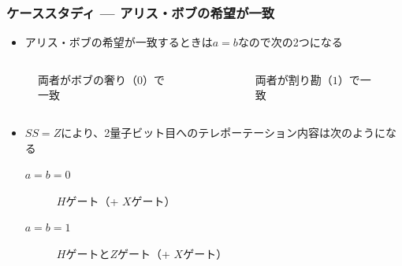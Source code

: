 \begin{frame}
  \frametitle{ケーススタディ --- アリス・ボブの希望が一致}

  \begin{itemize}
    \item アリス・ボブの希望が一致するときは$a = b$なので次の2つになる
  \end{itemize}

  \begin{columns}
    \begin{column}{0.5\textwidth}
      \begin{figure}
        \caption{両者がボブの奢り（$0$）で一致}
        \label{fig:a_equal_0}
      \end{figure}
    \end{column}
    \begin{column}{0.5\textwidth}
      \begin{figure}
        \caption{両者が割り勘（$1$）で一致}
        \label{fig:a_equal_1}
      \end{figure}
    \end{column}
  \end{columns}

  \pause
  \begin{itemize}
    \item $SS = Z$により、2量子ビット目へのテレポーテーション内容は次のようになる
    \begin{description}
      \item[$a = b = 0$] $H$ゲート（+ $X$ゲート）
      \item[$a = b = 1$] $H$ゲートと$Z$ゲート（+ $X$ゲート）
    \end{description}
  \end{itemize}

  \pause
\end{frame}

